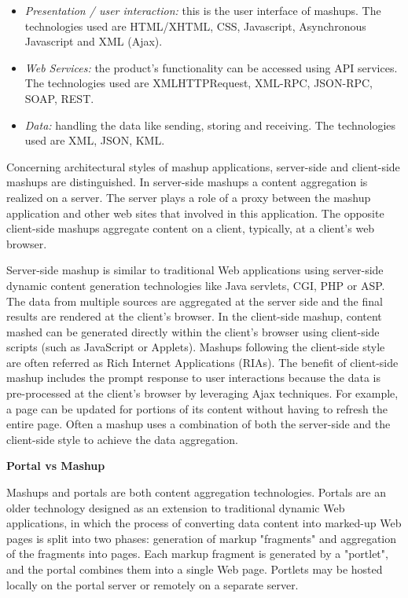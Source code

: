 		 \newline
		 \begin{itemize}
		\item \emph{Presentation / user interaction:} this is the user interface of mashups. The technologies used are HTML/XHTML, CSS, Javascript, Asynchronous Javascript and XML (Ajax).
		\item \emph{Web Services:} the product's functionality can be accessed using API services. The technologies used are XMLHTTPRequest, XML-RPC, JSON-RPC, SOAP, REST.
		\item \emph{Data:} handling the data like sending, storing and receiving. The technologies used are XML, JSON, KML.
		\end{itemize}

		Concerning architectural styles of mashup applications, server-side and client-side mashups are distinguished. In server-side mashups a content aggregation is realized on a server\cite{mashA}. The server plays a role of a proxy between the mashup application and other web sites that involved in this application. The opposite client-side mashups aggregate content on a client, typically, at a client's web browser\cite{mashB}.

	 Server-side mashup is similar to traditional Web applications using server-side dynamic content generation technologies like Java servlets, CGI, PHP or ASP. The data from multiple sources are aggregated at the server side and the final results are rendered at the client’s browser. In the client-side mashup, content mashed can be generated directly within the client’s browser using client-side scripts (such as JavaScript or Applets). Mashups following the client-side style are often referred as Rich Internet Applications (RIAs). The benefit of client-side mashup includes the prompt response to user interactions because the data is pre-processed at the client’s browser by leveraging Ajax techniques. For example, a page can be updated for portions of its content without having to refresh the entire page. Often a mashup uses a combination of both the server-side and the client-side style to achieve the data aggregation\cite{bolin2005end}.

        \textbf{Portal vs Mashup}

		Mashups and portals are both content aggregation technologies. Portals are an older technology designed as an extension to traditional dynamic Web applications, in which the process of converting data content into marked-up Web pages is split into two phases: generation of markup "fragments" and aggregation of the fragments into pages. Each markup fragment is generated by a "portlet", and the portal combines them into a single Web page. Portlets may be hosted locally on the portal server or remotely on a separate server.


